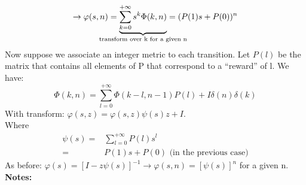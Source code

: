 $$\rightarrow \varphi(s,n)= \underbrace{\sum\limits_{k=0}^{+\infty} s^k \Phi(k,n)}_{\mathclap{\text{transform over k for a given n}}}=(P(1)s+P(0))^n$$
Now suppose we associate an integer metric to each transition. Let $P(l)$ be the matrix that contains all elements of P that correspond to a ``reward'' of l. We have:
$$\Phi(k,n) = \sum\limits_{l=0}^{+\infty} \Phi(k-l,n-1)P(l) + I\delta(n)\delta(k)$$
With transform: $\varphi(s,z) = \varphi(s,z)\psi(s)z + I$.\\
Where
\begin{equation}
\begin{split}
		\psi(s) =& \sum\limits_{l=0}^{+\infty} P(l)s^l \\
						=& P(1)s + P(0) \text{  (in the previous case)}
\end{split}
\end{equation}
As before: $\varphi(s) = [I - z\psi(s)]^{-1} \rightarrow \varphi(s,n)=[\psi(s)]^n$ for a given n.\\
\textbf{Notes:}
